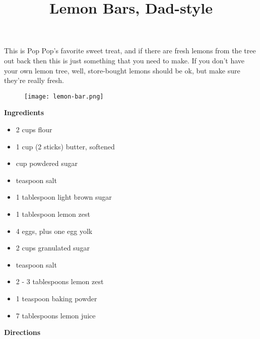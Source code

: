 \documentclass{article}
\title{Lemon Bars, Dad-style}
\begin{document}
This is Pop Pop's favorite sweet treat, and if there are fresh lemons from the tree out
back then this is just something that you need to make. If you don't have your own
lemon tree, well, store-bought lemons should be ok, but make sure they're really fresh.

\begin{figure}
      \centering
      \texttt{[image: lemon-bar.png]}
\end{figure}

\bigskip

\textbf{Ingredients}

\begin{multicols}{2}

      \begin{itemize}
            \item 2 cups flour
            \item 1 cup (2 sticks) butter, softened
            \item {} cup powdered sugar
            \item {} teaspoon salt
            \item 1 tablespoon light brown sugar
            \item 1 tablespoon lemon zest

                  \columnbreak

            \item 4 eggs, plus one egg yolk
            \item 2 cups granulated sugar
            \item {} teaspoon salt
            \item 2 - 3 tablespoons lemon zest
            \item 1 teaspoon baking powder
            \item 7 tablespoons lemon juice
      \end{itemize}

\end{multicols}

\textbf{Directions}
\end{document}

